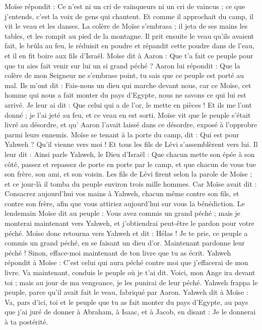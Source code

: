\begin{multicols}{2}
Moïse répondit : Ce n’est ni un cri de vainqueurs ni un cri de vaincus ; ce que j’entends, c’est la voix de gens qui chantent.
Et comme il approchait du camp, il vit le veau et les danses. La colère de Moïse s'embrasa ; il jeta de ses mains les tables, et les rompit au pied de la montagne.
Il prit ensuite le veau qu'ils avaient fait, le brûla au feu, le réduisit en poudre et répandit cette poudre dans de l'eau, et il en fit boire aux fils d'Israël\FTNT{}.
Moïse dit à Aaron : Que t'a fait ce peuple pour que tu aies fait venir sur lui un si grand péché ?
Aaron lui répondit : Que la colère de mon Seigneur ne s'embrase point, tu sais que ce peuple est porté au mal.
Ils m'ont dit : Fais-nous un dieu qui marche devant nous, car ce Moïse, cet homme qui nous a fait monter du pays d'Egypte, nous ne savons ce qui lui est arrivé.
Je leur ai dit : Que celui qui a de l'or, le mette en pièces ! Et ils me l'ont donné ; je l'ai jeté au feu, et ce veau en est sorti.
Moïse vit que le peuple s’était livré au désordre, et qu’ Aaron l'avait laissé dans ce désordre, exposé à l’opprobre parmi leurs ennemis.
Moïse se tenant à la porte du camp, dit : Qui est pour Yahweh ? Qu'il vienne vers moi ! Et tous les fils de Lévi s'assemblèrent vers lui.
Il leur dit : Ainsi parle Yahweh, le Dieu d'Israël : Que chacun mette son épée à son côté, passez et repassez de porte en porte par le camp, et que chacun de vous tue son frère, son ami, et son voisin.
Les fils de Lévi firent selon la parole de Moïse ; et ce jour-là il tomba du peuple environ trois mille hommes.
Car Moïse avait dit : Consacrez aujourd'hui vos mains à Yahweh, chacun même contre son fils, et contre son frère, afin que vous attiriez aujourd'hui sur vous la bénédiction.
Le lendemain Moïse dit au peuple : Vous avez commis un grand péché ; mais je monterai maintenant vers Yahweh, et j’obtiendrai peut-être le pardon pour votre péché.
Moïse donc retourna vers Yahweh et dit : Hélas ! Je te prie, ce peuple a commis un grand péché, en se faisant un dieu d'or.
Maintenant pardonne leur péché ! Sinon, efface-moi maintenant de ton livre que tu as écrit.
Yahweh répondit à Moïse : C’est celui qui aura péché contre moi que j’effacerai de mon livre\FTNT{}.
Va maintenant, conduis le peuple où je t’ai dit. Voici, mon Ange ira devant toi ; mais au jour de ma vengeance, je les punirai de leur péché.
Yahweh frappa le peuple, parce qu'il avait fait le veau, fabriqué par Aaron.
\VerseOne{}Yahweh dit à Moïse : Va, pars d'ici, toi et le peuple que tu as fait monter du pays d'Egypte, au pays que j'ai juré de donner à Abraham, à Isaac, et à Jacob, en disant : Je le donnerai à ta postérité.

\end{multicols}
